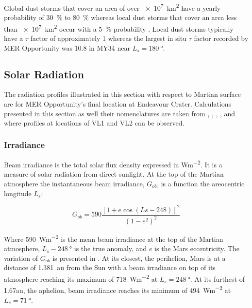 Global dust storms that cover an area of over \SI{e7}{\kilo\meter\squared} have a yearly probability of \SI{30}{\percent} to \SI{80}{\percent} whereas local dust storms that cover an area less than \SI{e7}{\kilo\meter\squared} occur with a \SI{5}{\percent} probability . Local dust storms typically have a $\tau$ factor of approximately 1  whereas the largest in situ $\tau$ factor recorded by \ac{MER} Opportunity was 10.8 in \ac{MY}34 near $L_{s} = \SI{180}{\degree}$.

\subsection{Solar Radiation}
\label{sec:MartianEnvironment:SolarRadiation}

The radiation profiles illustrated in this section with respect to Martian surface are for MER Opportunity's final location at Endeavour Crater. Calculations presented in this section as well their nomenclatures are taken from , , , , and  where profiles at locations of \ac{VL1} and \ac{VL2} can be observed.

\subsubsection{Irradiance}
\label{sec:MartianEnvironment:SolarRadiation:Irradiance}

Beam irradiance is the total solar flux density expressed in \si{Wm^{-2}}. It is a measure of solar radiation from direct sunlight. At the top of the Martian atmosphere the instantaneous beam irradiance, $G_{ob}$, is a function the areocentric longitude $L_{s}$:

\begin{equation}
  \label{eq:G_ob}
  G_{ob} = 590 \frac{[1 + e \cos{(Ls - 248)}]^2}{(1-e^2)^2}
\end{equation}

Where \SI{590}{Wm^{-2}} is the mean beam irradiance at the top of the Martian atmosphere, $L_{s} - \SI{248}{\degree}$ is the true anomaly, and $e$ is the Mars eccentricity. The variation of $G_{ob}$ is presented in . At its closest, the perihelion, Mars is at a distance of \SI{1.381}{\astronomicalunit} from the Sun with a beam irradiance on top of its atmosphere reaching its maximum of \SI{718}{Wm^{-2}} at $L_{s} = \SI{248}{\degree}$. At its furthest of 1.67\si{\astronomicalunit}, the aphelion, beam irradiance reaches its minimum of \SI{494}{Wm^{-2}} at $L_{s} = \SI{71}{\degree}$.


